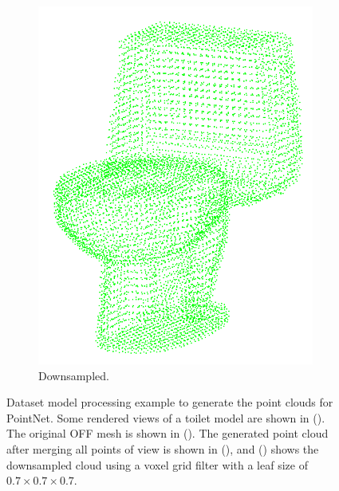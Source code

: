 \begin{figure}[!t]
\begin{subfigure}{0.32\linewidth}
    \includegraphics[width=\linewidth]{Figures/ObjRecog/toilet_cloud_downsampled.png}
    \caption{Downsampled.}
    \label{fig:objrecog:dataproc:downsampled}
  \end{subfigure}
  \caption{Dataset model processing example to generate the point clouds for PointNet. Some rendered views of a toilet model are shown in (). The original \ac{OFF} mesh is shown in (). The generated point cloud after merging all points of view is shown in (), and () shows the downsampled cloud using a voxel grid filter with a leaf size of $0.7 \times 0.7 \times 0.7$.}
  \label{fig:objrecog:pointnetarch}
\end{figure}

